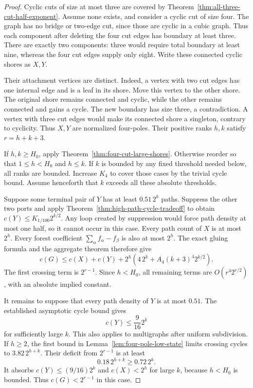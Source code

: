 \begin{proof}
Cyclic cuts of size at most three are covered by
Theorem~\ref{thm:all-three-cut-half-exponent}.
Assume none exists, and consider a cyclic cut of size four.
The graph has no bridge or two-edge cut, since those are cyclic in a cubic graph.
Thus each component after deleting the four cut edges has boundary at least three.
There are exactly two components: three would require total boundary at least nine,
whereas the four cut edges supply only eight.
Write these connected cyclic shores as $X,Y$.

Their attachment vertices are distinct.
Indeed, a vertex with two cut edges has one internal edge and is a leaf in its shore.
Move this vertex to the other shore.
The original shore remains connected and cyclic, while the other remains connected
and gains a cycle. The new boundary has size three, a contradiction.
A vertex with three cut edges would make its connected shore a singleton,
contrary to cyclicity.
Thus $X,Y$ are normalized four-poles.
Their positive ranks $h,k$ satisfy $r=h+k+3$.

If $h,k\ge H_0$, apply Theorem~\ref{thm:four-cut-large-shores}.
Otherwise reorder so that $1\le h<H_0$ and $h\le k$.
If $k$ is bounded by any fixed threshold needed below, all ranks are bounded.
Increase $K_4$ to cover those cases by the trivial cycle bound.
Assume henceforth that $k$ exceeds all these absolute thresholds.

Suppose some terminal pair of $Y$ has at least $0.51\,2^k$ paths.
Suppress the other two ports and apply
Theorem~\ref{thm:high-path-cycle-tradeoff} to obtain
$c(Y)\le K_{1/100}2^{k/2}$.
Any loop created by suppression would force path density at most one half,
so it cannot occur in this case.
Every path count of $X$ is at most $2^h$.
Every forest coefficient $\sum_\alpha f_\alpha-f_\beta$ is also at most $2^h$.
The exact gluing formula and the aggregate theorem therefore give
\[
 c(G)\le c(X)+c(Y)+2^h
 \left(4\,2^k+A_4(k+3)^4 2^{k/2}\right).
\]
The first crossing term is $2^{r-1}$.
Since $h<H_0$, all remaining terms are
$O(r^4 2^{r/2})$, with an absolute implied constant.

It remains to suppose that every path density of $Y$ is at most $0.51$.
The established asymptotic cycle bound gives
\[
 c(Y)\le\frac9{16}2^k
\]
for sufficiently large $k$.
This also applies to multigraphs after uniform subdivision.
If $h\ge2$, the first bound in Lemma~\ref{lem:four-pole-low-state}
limits crossing cycles to $3.82\,2^{h+k}$.
Their deficit from $2^{r-1}$ is at least
\[
 0.18\,2^{h+k}\ge0.72\,2^k.
\]
It absorbs $c(Y)\le(9/16)2^k$ and $c(X)<2^h$ for large $k$,
because $h<H_0$ is bounded.
Thus $c(G)<2^{r-1}$ in this case.


\end{proof}
